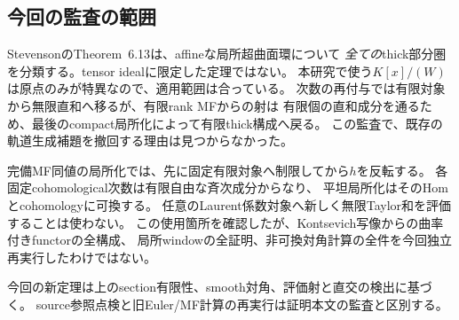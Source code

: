 \subsection{今回の監査の範囲}

StevensonのTheorem~6.13\cite{CRSStevenson}は、affineな局所超曲面環について
\emph{全ての}thick部分圏を分類する。tensor idealに限定した定理ではない。
本研究で使う$K[x]/(W)$は原点のみが特異なので、適用範囲は合っている。
次数の再付与では有限対象から無限直和へ移るが、有限rank MFからの射は
有限個の直和成分を通るため、最後のcompact局所化によって有限thick構成へ戻る。
この監査で、既存の軌道生成補題を撤回する理由は見つからなかった。

完備MF同値の局所化では、先に固定有限対象へ制限してから$h$を反転する。
各固定cohomological次数は有限自由な斉次成分からなり、
平坦局所化はそのHomとcohomologyに可換する。
任意のLaurent係数対象へ新しく無限Taylor和を評価することは使わない。
この使用箇所を確認したが、Kontsevich写像からの曲率付きfunctorの全構成、
局所windowの全証明、非可換対角計算の全件を今回独立再実行したわけではない。

今回の新定理は上のsection有限性、smooth対角、評価射と直交の検出に基づく。
source参照点検と旧Euler/MF計算の再実行は証明本文の監査と区別する。
